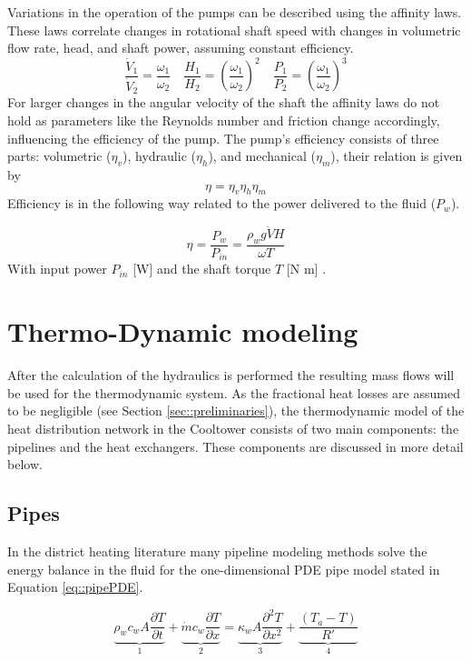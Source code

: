 Variations in the operation of the pumps can be described using the affinity laws. These laws correlate changes in rotational shaft speed with changes in volumetric flow rate, head, and shaft power, assuming constant efficiency. 
\begin{equation}
\frac{\dot{V}_1}{\dot{V}_2}=\frac{\omega_1}{\omega_2} \quad \frac{H_1}{H_2}=\left(\frac{\omega_1}{\omega_2}\right)^2 \quad \frac{P_1}{P_2}=\left(\frac{\omega_1}{\omega_2}\right)^3
\end{equation}
For larger changes in the angular velocity of the shaft the affinity laws do not hold as parameters like the Reynolds number and friction change accordingly, influencing the efficiency of the pump. 
The pump's efficiency consists of three parts: volumetric ($\eta_v$), hydraulic ($\eta_h$), and mechanical ($\eta_m$), their relation is given by
\begin{equation}\label{eq::effpump}
    \eta = \eta_v\eta_h\eta_m
\end{equation}
Efficiency is in the following way related to the power delivered to the fluid ($P_w$).

\begin{equation}\label{eq::}
    \eta = \frac{P_w}{P_{in}} = \frac{\rho_w g \dot{V} H}{\omega T}
\end{equation}
With input power $P_{in}$ [W] and the shaft torque $T$ [N m] \cite{white2011fluid}. 

\section{Thermo-Dynamic modeling}\label{sec::thermo}
After the calculation of the hydraulics is performed the resulting mass flows will be used for the thermodynamic system. As the fractional heat losses are assumed to be negligible (see Section \ref{sec::preliminaries}), the thermodynamic model of the heat distribution network in the Cooltower consists of two main components: the pipelines and the heat exchangers. These components are discussed in more detail below. 

\subsection{Pipes}\label{sec::thermopipes}
In the district heating literature many pipeline modeling methods solve the energy balance in the fluid for the one-dimensional PDE pipe model stated in  Equation \ref{eq::pipePDE}.

\begin{equation}\label{eq::pipePDE}
\underbrace{\rho_w c_w A \frac{\partial T}{\partial t}}_1+\underbrace{\dot{m} c_w \frac{\partial T}{\partial x}}_2=\underbrace{\kappa_w A \frac{\partial^2 T}{\partial x^2}}_3+\underbrace{\frac{\left(T_a-T\right)}{R'}}_4
\end{equation}

